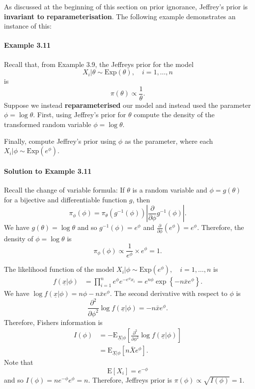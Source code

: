 \clearpage

As discussed at the beginning of this section on prior ignorance, Jeffrey's prior is \textbf{\color{darkblue}invariant to reparameterisation}. The following example demonstrates an instance of this:

\paragraph{Example 3.11}{Recall that, from Example 3.9, the Jeffreys prior for the model
    $$ X_i|\theta\sim \mathrm{Exp}(\theta), \quad i = 1,\ldots, n $$
    is
    $$ \pi(\theta) \propto \frac{1}{\theta}. $$
    Suppose we instead \textbf{\color{darkblue}reparameterised} our model and instead used the parameter $\phi = \log \theta$. First, using Jeffrey's prior for $\theta$ compute the density of the transformed random variable $\phi = \log\theta$. 
    
    Finally, compute Jeffrey's prior using $\phi$ as the parameter, where each $X_i|\phi \sim \mathrm{Exp}(e^{\phi})$.
    
    \paragraph{Solution to Example 3.11}{
        
        Recall the change of variable formula:  If $\theta$ is a random variable and $\phi = g(\theta)$ for a bijective and differentiable function $g$, then
        $$ \pi_{\phi}(\phi) = \pi_{\theta}(g^{-1}(\phi))\left|\frac{\partial}{\partial \phi} g^{-1}(\phi)\right|. $$
        We have $g(\theta) = \log\theta$ and so $g^{-1}(\phi) = e^{\phi}$ and $\frac{\partial}{\partial\phi}  \left(e^{\phi}\right) = e^{\phi}.$
        Therefore, the density of $\phi = \log \theta$ is
        $$ \pi_{\phi}(\phi) \propto \frac{1}{e^{\phi}} \times e^{\phi}  = 1.$$

        The likelihood function of the model $X_i|\phi \sim \mathrm{Exp}(e^{\phi}), \quad i=1,\ldots,n$ is
         \begin{align*}
             f(\underline{x}|\phi) &= \prod_{i=1}^n e^{\phi} e^{-e^{\phi}x_i} = e^{n\phi} \exp\left\{-n\bar{x}e^{\phi}\right\}.
         \end{align*}
         We have $\log f(\underline{x}|\phi) = n\phi -  n\bar{x}e^{\phi}.$
         The second derivative with respect to $\phi$ is
         $$ \frac{\partial^2}{\partial\phi^2} \log f(\underline{x}|\phi) = - n\bar{x}e^{\phi}.$$
         Therefore, Fishers information is
        \begin{align*}
            I(\phi) &= -\text{E}_{\underline{X}|\phi}\left[\frac{\partial^2}{\partial\phi^2} \log f(\underline{x}|\phi) \right] \\
            &= \text{E}_{\underline{X}|\phi}[n\bar{X}e^{\phi}].
        \end{align*}
        Note that $$\text{E}[X_i] = e^{-\phi}$$ and so $I(\phi) = n e^{-\phi} e^{\phi} = n$. Therefore, Jeffreys prior is
        $\pi(\phi) \propto \sqrt{I(\phi)} = 1$.
        
    }}

